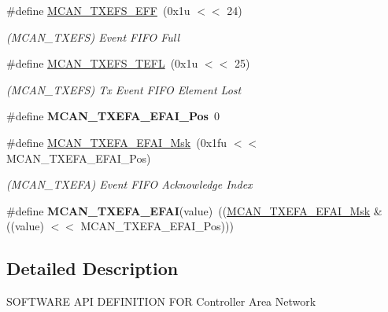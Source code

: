 \begin{DoxyCompactItemize}
\mbox{\label{group__SAME70__MCAN_ga3ab338d5bb14ecffaf35ea3540259e8d}} 
\#define \mbox{\hyperlink{group__SAME70__MCAN_ga3ab338d5bb14ecffaf35ea3540259e8d}{M\+C\+A\+N\+\_\+\+T\+X\+E\+F\+S\+\_\+\+E\+FF}}~(0x1u $<$$<$ 24)
\begin{DoxyCompactList}\small\item\em (M\+C\+A\+N\+\_\+\+T\+X\+E\+FS) Event F\+I\+FO Full \end{DoxyCompactList}\item 
\mbox{\label{group__SAME70__MCAN_gab76043f68e23951e8b5e4513c1a3e724}} 
\#define \mbox{\hyperlink{group__SAME70__MCAN_gab76043f68e23951e8b5e4513c1a3e724}{M\+C\+A\+N\+\_\+\+T\+X\+E\+F\+S\+\_\+\+T\+E\+FL}}~(0x1u $<$$<$ 25)
\begin{DoxyCompactList}\small\item\em (M\+C\+A\+N\+\_\+\+T\+X\+E\+FS) Tx Event F\+I\+FO Element Lost \end{DoxyCompactList}\item 
\mbox{\label{group__SAME70__MCAN_gaf97f398bccbd6b3a02f0d33ae3a1a74d}} 
\#define {\bfseries M\+C\+A\+N\+\_\+\+T\+X\+E\+F\+A\+\_\+\+E\+F\+A\+I\+\_\+\+Pos}~0
\item 
\mbox{\label{group__SAME70__MCAN_gad0b2e64c4288ede05f8df8bc64d49261}} 
\#define \mbox{\hyperlink{group__SAME70__MCAN_gad0b2e64c4288ede05f8df8bc64d49261}{M\+C\+A\+N\+\_\+\+T\+X\+E\+F\+A\+\_\+\+E\+F\+A\+I\+\_\+\+Msk}}~(0x1fu $<$$<$ M\+C\+A\+N\+\_\+\+T\+X\+E\+F\+A\+\_\+\+E\+F\+A\+I\+\_\+\+Pos)
\begin{DoxyCompactList}\small\item\em (M\+C\+A\+N\+\_\+\+T\+X\+E\+FA) Event F\+I\+FO Acknowledge Index \end{DoxyCompactList}\item 
\mbox{\label{group__SAME70__MCAN_ga26fc42b1d9019b461a18b2f7108ffa88}} 
\#define {\bfseries M\+C\+A\+N\+\_\+\+T\+X\+E\+F\+A\+\_\+\+E\+F\+AI}(value)~((\mbox{\hyperlink{group__SAMV71__MCAN_gad0b2e64c4288ede05f8df8bc64d49261}{M\+C\+A\+N\+\_\+\+T\+X\+E\+F\+A\+\_\+\+E\+F\+A\+I\+\_\+\+Msk}} \& ((value) $<$$<$ M\+C\+A\+N\+\_\+\+T\+X\+E\+F\+A\+\_\+\+E\+F\+A\+I\+\_\+\+Pos)))
\end{DoxyCompactItemize}


\subsection{Detailed Description}
S\+O\+F\+T\+W\+A\+RE A\+PI D\+E\+F\+I\+N\+I\+T\+I\+ON F\+OR Controller Area Network 